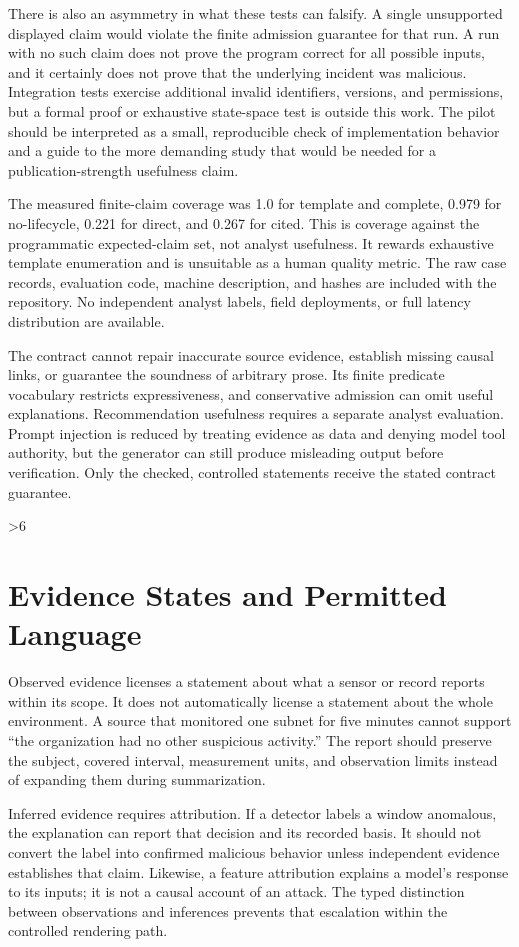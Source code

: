 There is also an asymmetry in what these tests can falsify. A single unsupported displayed claim would violate the finite admission guarantee for that run. A run with no such claim does not prove the program correct for all possible inputs, and it certainly does not prove that the underlying incident was malicious. Integration tests exercise additional invalid identifiers, versions, and permissions, but a formal proof or exhaustive state-space test is outside this work. The pilot should be interpreted as a small, reproducible check of implementation behavior and a guide to the more demanding study that would be needed for a publication-strength usefulness claim.

The measured finite-claim coverage was 1.0 for template and complete, 0.979 for no-lifecycle, 0.221 for direct, and 0.267 for cited. This is coverage against the programmatic expected-claim set, not analyst usefulness. It rewards exhaustive template enumeration and is unsuitable as a human quality metric. The raw case records, evaluation code, machine description, and hashes are included with the repository. No independent analyst labels, field deployments, or full latency distribution are available.

The contract cannot repair inaccurate source evidence, establish missing causal links, or guarantee the soundness of arbitrary prose. Its finite predicate vocabulary restricts expressiveness, and conservative admission can omit useful explanations. Recommendation usefulness requires a separate analyst evaluation. Prompt injection is reduced by treating evidence as data and denying model tool authority, but the generator can still produce misleading output before verification. Only the checked, controlled statements receive the stated contract guarantee.

\ifnum\variant>6
\section{Evidence States and Permitted Language}
Observed evidence licenses a statement about what a sensor or record reports within its scope. It does not automatically license a statement about the whole environment. A source that monitored one subnet for five minutes cannot support ``the organization had no other suspicious activity.'' The report should preserve the subject, covered interval, measurement units, and observation limits instead of expanding them during summarization.

Inferred evidence requires attribution. If a detector labels a window anomalous, the explanation can report that decision and its recorded basis. It should not convert the label into confirmed malicious behavior unless independent evidence establishes that claim. Likewise, a feature attribution explains a model's response to its inputs; it is not a causal account of an attack. The typed distinction between observations and inferences prevents that escalation within the controlled rendering path.

